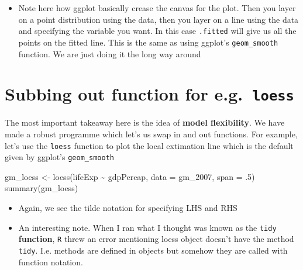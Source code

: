 \documentclass[
]{report}
\newenvironment{Shaded}{\begin{snugshade}}{\end{snugshade}}
\newcommand{\AttributeTok}[1]{\textcolor[rgb]{0.80,0.80,0.80}{#1}}
\newcommand{\DecValTok}[1]{\textcolor[rgb]{0.86,0.86,0.80}{#1}}
\newcommand{\FunctionTok}[1]{\textcolor[rgb]{0.94,0.94,0.56}{#1}}
\newcommand{\NormalTok}[1]{\textcolor[rgb]{0.80,0.80,0.80}{#1}}
\newcommand{\OtherTok}[1]{\textcolor[rgb]{0.94,0.94,0.56}{#1}}
\newcommand{\SpecialCharTok}[1]{\textcolor[rgb]{0.86,0.64,0.64}{#1}}
\providecommand{\tightlist}{%
  \setlength{\itemsep}{0pt}\setlength{\parskip}{0pt}}
\renewenvironment{Shaded}{
	\bigskip
	\begin{tcolorbox}[drop fuzzy midday shadow]
		\begin{mdframed}[
				skipabove=\topskip*2,
				outerlinewidth= 0,
				linewidth=0pt,
				roundcorner= 3pt,
				backgroundcolor= shadecolor,
				outerlinecolor= shadecolor,
				innertopmargin= \topskip,
				innerbottommargin=\topskip,
				leftmargin=-0.8cm,
				rightmargin=-0.8cm
			]}{
		\end{mdframed}
	\end{tcolorbox}
	\smallskip
}
\theoremstyle{definition}
\theoremstyle{definition}
\theoremstyle{definition}
\theoremstyle{definition}
\theoremstyle{remark}
\begin{document}
\begin{itemize}
\tightlist
\item
  Note here how ggplot basically crease the canvas for the plot. Then you layer
  on a point distribution using the data, then you layer on a line using the
  data and specifying the variable you want. In this case \texttt{.fitted} will give
  us all the points on the fitted line. This is the same as using ggplot's
  \texttt{geom\_smooth} function. We are just doing it the long way around
\end{itemize}

\hypertarget{subbing-out-function-for-e.g.-loess}{%
\section{\texorpdfstring{Subbing out function for e.g.~\texttt{loess}}{Subbing out function for e.g.~loess}}\label{subbing-out-function-for-e.g.-loess}}

The most important takeaway here is the idea of \textbf{model flexibility}. We have
made a robust programme which let's us swap in and out functions. For example,
let's use the \texttt{loess} function to plot the local extimation line which is the
default given by ggplot's \texttt{geom\_smooth}

\begin{Shaded}
\begin{Highlighting}[numbers=left,,]
\NormalTok{gm\_loess }\OtherTok{\textless{}{-}} \FunctionTok{loess}\NormalTok{(lifeExp }\SpecialCharTok{\textasciitilde{}}\NormalTok{ gdpPercap, }\AttributeTok{data =}\NormalTok{ gm\_2007, }\AttributeTok{span =}\NormalTok{ .}\DecValTok{5}\NormalTok{)}
\FunctionTok{summary}\NormalTok{(gm\_loess)}
\end{Highlighting}
\end{Shaded}

\begin{itemize}
\tightlist
\item
  Again, we see the tilde notation for specifying LHS and RHS
\item
  An interesting note. When I ran what I thought was known as the \texttt{tidy}
  \textbf{function}, \texttt{R} threw an error mentioning loess object doesn't have the
  method \texttt{tidy}. I.e. methods are defined in objects but somehow they are
  called with function notation.
\end{itemize}
\end{document}
